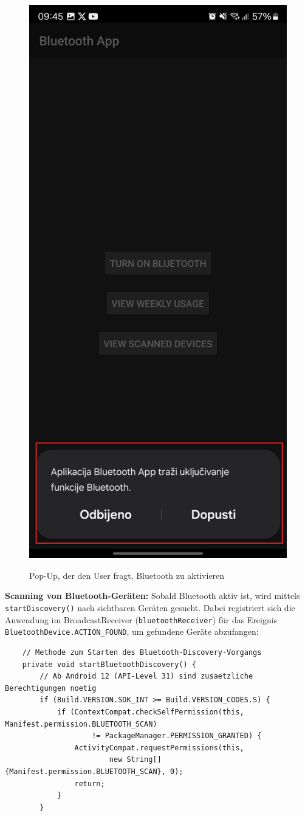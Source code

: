 \documentclass[a4paper, 12pt]{article} %
\begin{document}
\begin{spacing}{1.8}
    \begin{figure}[H]
        \includegraphics[width=0.5\linewidth]{images/Screenshot_20250113_094518_Settings.jpg}\\[1ex]
        \centering
        \caption{Pop-Up, der den User fragt, Bluetooth zu aktivieren\cite{lukiano12_lkw_assist}}
        \label{ABBILDUNG 76}
    \end{figure}

\textbf{Scanning von Bluetooth-Geräten\cite{lukiano12_lkw_assist}:} Sobald Bluetooth aktiv ist, wird mittels \texttt{startDiscovery()} nach sichtbaren Geräten gesucht. 
Dabei registriert sich die Anwendung im BroadcastReceiver (\texttt{bluetoothReceiver}) für das Ereignis \texttt{BluetoothDevice.ACTION\_FOUND}, um gefundene Geräte abzufangen:

\begin{lstlisting}
    // Methode zum Starten des Bluetooth-Discovery-Vorgangs
    private void startBluetoothDiscovery() {
        // Ab Android 12 (API-Level 31) sind zusaetzliche Berechtigungen noetig
        if (Build.VERSION.SDK_INT >= Build.VERSION_CODES.S) {
            if (ContextCompat.checkSelfPermission(this, Manifest.permission.BLUETOOTH_SCAN)
                    != PackageManager.PERMISSION_GRANTED) {
                ActivityCompat.requestPermissions(this,
                        new String[]{Manifest.permission.BLUETOOTH_SCAN}, 0);
                return;
            }
        }
    

\end{lstlisting}
\end{spacing}
\end{document}

